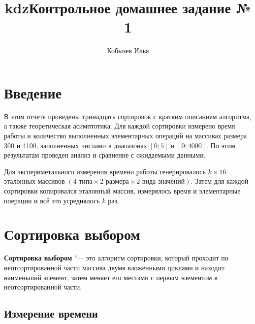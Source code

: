 \documentclass[11pt]{article}
\title{kdz}
\begin{document}
\begin{titlepage}
    \title{\textbf{Контрольное домашнее задание № 1}}
    \author{Кобызев Илья}
    \date{}
    \maketitle
\end{titlepage}

\tableofcontents
\newpage

\section*{\centering Введение}
В этом отчете приведены тринадцать сортировок с кратким описанием
алгоритма, а также теоретическая асимптотика. Для каждой сортировки измерено
время работы и количество выполненных элементарных операций на массивах размера 300 и 4100, заполненных
числами в диапазонах $\left[ 0 ; 5 \right]$ и $\left[ 0 ; 4000 \right]$. По этим результатам проведен анализ и сравнение с
ожидаемыми данными.

Для экспериметального измерения времени работы генерировалось $k \times 16$ эталонных массивов
$\left( 4 \text{ типа} \times 2 \text{ размера} \times 2 \text{ вида значений}\right)$. Затем для каждой
сортировки копировался эталонный массив, измерялось время и элементарные операции и всё это усреднялось
$k$ раз.
\newpage

\setcounter{section}{1}
\section*{\centering Сортировка выбором}

\textbf{Сортировка выбором} "--- это алгоритм сортировки,
который проходит по неотсортированной части массива двумя вложенными циклами и находит
наименьший элемент, затем меняет его местами с первым элементом в неотсортированной части.

\subsection{Измерение времени}

\begin{center}
\end{center}
{ \hspace*{\fill} }
\end{document}
